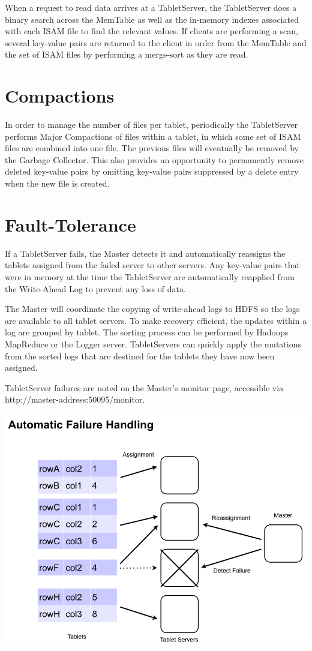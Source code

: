 When a request to read data arrives at a TabletServer, the TabletServer does a
binary search across the MemTable as well as the in-memory indexes associated
with each ISAM file to find the relevant values. If clients are performing a
scan, several key‐value pairs are returned to the client in order from the
MemTable and the set of ISAM files by performing a merge‐sort as they are read.

\section{Compactions}

In order to manage the number of files per tablet, periodically the TabletServer
performs Major Compactions of files within a tablet, in which some set of ISAM
files are combined into one file. The previous files will eventually be removed
by the Garbage Collector. This also provides an opportunity to permanently
remove deleted key‐value pairs by omitting key‐value pairs suppressed by a
delete entry when the new file is created.

\section{Fault-Tolerance}

If a TabletServer fails, the Master detects it and automatically reassigns the tablets
assigned from the failed server to other servers. Any key-value pairs that were in
memory at the time the TabletServer are automatically reapplied from the Write-Ahead
Log to prevent any loss of data.

The Master will coordinate the copying of write-ahead logs to HDFS so the logs
are available to all tablet servers. To make recovery efficient, the updates
within a log are grouped by tablet.  The sorting process can be performed by
Hadoops MapReduce or the Logger server. TabletServers can quickly apply the
mutations from the sorted logs that are destined for the tablets they have now
been assigned.

TabletServer failures are noted on the Master's monitor page, accessible via\\
\mbox{http://master-address:50095/monitor}.

\begin{center}
\includegraphics[scale=0.4]{images/failure_handling.png}
\end{center}

